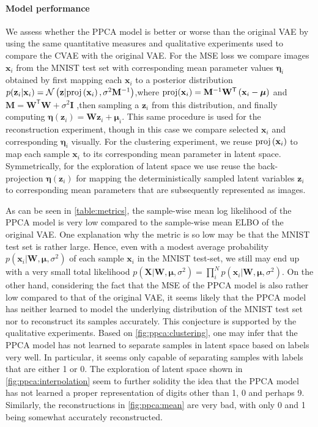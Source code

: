 \paragraph{Model performance}
We assess whether the PPCA model is better or worse than the original VAE by using the same quantitative measures and qualitative experiments used to compare the CVAE with the original VAE\@. For the MSE loss we compare images $\mathbf{x}_i$ from the MNIST test set with corresponding mean parameter values $\bm{\eta}_i$ obtained by first mapping each $\mathbf{x}_i$ to a posterior distribution $p(\mathbf{z}_i|\mathbf{x}_i) = \mathcal{N}\left (\mathbf{z}| \text{proj}\left (\mathbf{x}_i\right), \sigma^2 \mathbf{M}^{-1}\right)$,where  $\text{proj}(\mathbf{x}_i) = \mathbf{M}^{-1} \mathbf{W}^{\mathsf{T}}\left (\mathbf{x}_i - \bm{\mu}\right)$ and $\mathbf{M} = \mathbf{W}^{\mathsf{T}}\mathbf{W} + \sigma^2 \mathbf{I}$ ,then sampling a $\mathbf{z}_i$ from this distribution, and finally computing $\bm{\eta}(\mathbf{z}_i) = \mathbf{W}\mathbf{z}_i + \bm{\mu}_i$. This same procedure is used for the reconstruction experiment, though in this case we compare selected $\mathbf{x}_i$ and corresponding $\bm{\eta}_i$ visually. For the clustering experiment, we reuse $\text{proj}\left (\mathbf{x}_i\right)$ to map each sample $\mathbf{x}_i$ to its corresponding mean parameter in latent space. Symmetrically, for the exploration of latent space we use reuse the back-projection $\bm{\eta}(\mathbf{z}_i)$ for mapping the deterministically sampled latent variables $\mathbf{z}_i$ to corresponding mean parameters that are subsequently represented as images.

As can be seen in \cref{table:metrics}, the sample-wise mean log likelihood of the PPCA model is very low compared to the sample-wise mean ELBO of the original VAE\@. One explanation why the metric is so low may be that the MNIST test set is rather large. Hence, even with a modest average probability $p(\mathbf{x}_i | \mathbf{W}, \bm{\mu}, \sigma^2)$ of each sample $\mathbf{x}_i$ in the MNIST test-set, we still may end up with a very small total likelihood $p(\mathbf{X}|\mathbf{W}, \bm{\mu}, \sigma^2 ) = \prod_{i}^{N}p(\mathbf{x}_i | \mathbf{W}, \bm{\mu}, \sigma^2)$. On the other hand, considering the fact that the MSE of the PPCA model is also rather low compared to that of the original VAE, it seems likely that the PPCA model has neither learned to model the underlying distribution of the MNIST test set nor to reconstruct its samples accurately. This conjecture is supported by the qualitative experiments. Based on \cref{fig:ppca:clustering}, one may infer that the PPCA model has not learned to separate samples in latent space based on labels very well. In particular, it seems only capable of separating samples with labels that are either 1 or 0. The exploration of latent space shown in \cref{fig:ppca:interpolation} seem to further solidity the idea that the PPCA model has not learned a proper representation of digits other than 1, 0 and perhaps 9. Similarly, the reconstructions in \cref{fig:ppca:mean} are very bad, with only 0 and 1 being somewhat accurately reconstructed.

